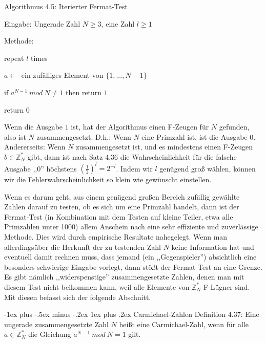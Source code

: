 \documentclass[a4paper]{article}
\makeatletter
\renewcommand{\subsubsection}{\@startsection{subsubsection}{3}{0mm}%
 {-1ex plus -.5ex minus -.2ex}%
 {1ex plus .2ex}%
 {\normalfont\small\bfseries}}
\makeatother
\begin{document}
\begin{multicols}{3}
        Algorithmus 4.5: Iterierter Fermat-Test
        \begin{itemize*}
            \item Eingabe: Ungerade Zahl $N\geq 3$, eine Zahl $l\geq 1$
            \item Methode:
            \begin{enumerate*}
                \item repeat $l$ times
                \begin{itemize*}
                    \item $a\leftarrow$ ein zufälliges Element von $\{1 ,...,N-1\}$
                    \item if $a^{N-1}\ mod\ N\not= 1$ then return $1$
                \end{itemize*}
                \item return 0
            \end{enumerate*}
        \end{itemize*}

        Wenn die Ausgabe $1$ ist, hat der Algorithmus einen F-Zeugen für $N$ gefunden, also ist $N$ zusammengesetzt. D.h.: Wenn $N$ eine Primzahl ist, ist die Ausgabe $0$. Andererseits: Wenn $N$ zusammengesetzt ist, und es mindestens einen F-Zeugen $b\in\mathbb{Z}^*_N$ gibt, dann ist nach Satz 4.36 die Wahrscheinlichkeit für die falsche Ausgabe ,,0'' höchstens $(\frac{1}{2})^l= 2^{-l}$. Indem wir $l$ genügend groß wählen, können wir die Fehlerwahrscheinlichkeit so klein wie gewünscht einstellen.

        Wenn es darum geht, aus einem genügend großen Bereich zufällig gewählte Zahlen darauf zu testen, ob es sich um eine Primzahl handelt, dann ist der Fermat-Test (in Kombination mit dem Testen auf kleine Teiler, etwa alle Primzahlen unter 1000) allem Anschein nach eine sehr effiziente und zuverlässige Methode. Dies wird durch empirische Resultate nahegelegt. Wenn man allerdingsüber die Herkunft der zu testenden Zahl $N$ keine Information hat und eventuell damit rechnen muss, dass jemand (ein ,,Gegenspieler'') absichtlich eine besonders schwierige Eingabe vorlegt, dann stößt der Fermat-Test an eine Grenze. Es gibt nämlich ,,widerspenstige'' zusammengesetzte Zahlen, denen man mit diesem Test nicht beikommen kann, weil alle Elemente von $\mathbb{Z}^*_N$ F-Lügner sind. Mit diesen befasst sich der folgende Abschnitt.

        \subsubsection{Carmichael-Zahlen}
        Definition 4.37: Eine ungerade zusammengesetzte Zahl $N$ heißt eine Carmichael-Zahl, wenn für alle $a\in\mathbb{Z}^*_N$ die Gleichung $a^{N-1}\ mod\ N= 1$ gilt.


\end{multicols}
\end{document}
